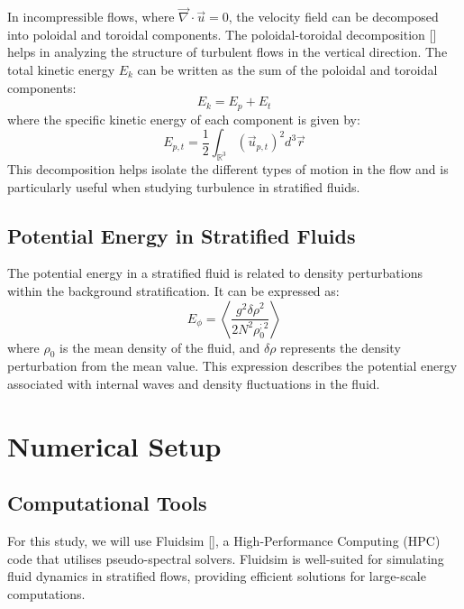 \documentclass[final,5p,times,twocolumn,authoryear]{elsarticle}
\begin{document}
In incompressible flows, where $\vec{\nabla} \cdot \vec{u} = 0$, the velocity field can be decomposed into poloidal and toroidal components. The poloidal-toroidal decomposition [\cite{schmitt_decomposition_1992}] helps in analyzing the structure of turbulent flows in the vertical direction. The total kinetic energy $E_k$ can be written as the sum of the poloidal and toroidal components:
\begin{equation*}
E_k = E_p + E_t
\end{equation*}
where the specific kinetic energy of each component is given by:
\begin{equation*}
E_{p,t} = \frac{1}{2} \int_{\mathbb{R}^3} \left( \vec{u}_{p,t} \right)^2 d^3 \vec{r}
\end{equation*}
This decomposition helps isolate the different types of motion in the flow and is particularly useful when studying turbulence in stratified fluids.

\subsection{Potential Energy in Stratified Fluids}

The potential energy in a stratified fluid is related to density perturbations within the background stratification. It can be expressed as:
\begin{equation}
E_\phi = \left\langle \frac{g^2 {\delta \rho}^2}{2 N^2 \rho_0^{;2}} \right\rangle \label{eq:Potential Energy}
\end{equation}
where $\rho_0$ is the mean density of the fluid, and $\delta \rho$ represents the density perturbation from the mean value. This expression describes the potential energy associated with internal waves and density fluctuations in the fluid.

\section{Numerical Setup}

\subsection{Computational Tools}

For this study, we will use Fluidsim [\cite{fluiddyn}], a High-Performance Computing (HPC) code that utilises pseudo-spectral solvers. Fluidsim is well-suited for simulating fluid dynamics in stratified flows, providing efficient solutions for large-scale computations.
\end{document}
